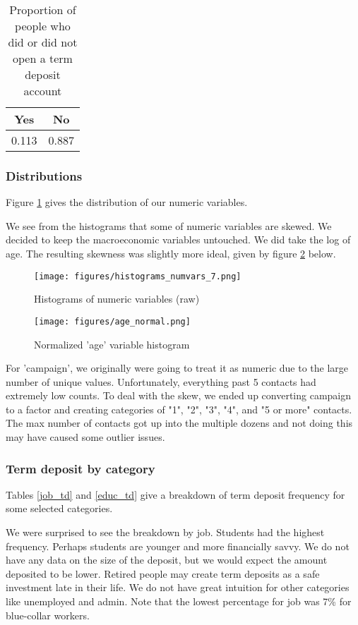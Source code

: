 \documentclass[12pt]{article}
\begin{document}
\begin{table}[h]
\centering
   \begin{tabular}{|c|c|}
    \hline
    Yes & No \\
    \hline
    0.113 & 0.887 \\
    \hline
\end{tabular}
\caption{Proportion of people who did or did not open a term deposit account \label{dependent_balance}}
\end{table}

\subsubsection*{Distributions}
Figure \ref{histograms} gives the distribution of our numeric variables. 

We see from the histograms that some of numeric variables are skewed. We decided to keep the macroeconomic variables untouched. We did take the log of age. The resulting skewness was slightly more ideal, given by figure \ref{Normalized 'age'} below.
 
\begin{figure}[ht]
    \centering
    \texttt{[image: figures/histograms\_numvars\_7.png]}
    \caption{Histograms of numeric variables (raw)}
    \label{histograms}
\end{figure}


\begin{figure}[ht]
    \centering
    \texttt{[image: figures/age\_normal.png]}
    \caption{Normalized 'age' variable histogram}
    \label{Normalized 'age'}
\end{figure}

For 'campaign', we originally were going to treat it as numeric due to the large number of unique values. Unfortunately, everything past 5 contacts had extremely low counts. To deal with the skew, we ended up converting campaign to a factor and creating categories of "1", "2", "3", "4", and "5 or more" contacts. The max number of contacts got up into the multiple dozens and not doing this may have caused some outlier issues.

\subsubsection*{Term deposit by category}
Tables \ref{job_td} and \ref{educ_td} give a breakdown of term deposit frequency for some selected categories.

We were surprised to see the breakdown by job. Students had the highest frequency. Perhaps students are younger and more financially savvy. We do not have any data on the size of the deposit, but we would expect the amount deposited to be lower. Retired people may create term deposits as a safe investment late in their life. We do not have great intuition for other categories like unemployed and admin. Note that the lowest percentage for job was 7\% for blue-collar workers.
\end{document}
